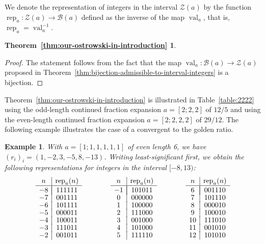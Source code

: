 \documentclass[a4paper,12pt]{amsart}
\newtheorem{example}[definition]{Example}
\newtheorem*{THEOREMA}{Theorem~\ref{thm:our-ostrowski-in-introduction}}
\newcommand{\Bcal}{{\mathcal{B}}}
\newcommand{\Zcal}{{\mathcal{Z}}}
\newcommand{\0}{\mathtt{0}}
\newcommand{\1}{\mathtt{1}}
\newcommand{\2}{\mathtt{2}}
\newcommand{\3}{\mathtt{3}}
\DeclareMathOperator{\rep}{rep}
\DeclareMathOperator{\val}{val}
\begin{document}
We denote the representation of integers in the interval $\Zcal(a)$
by the function $\rep_a:\Zcal(a)\to\Bcal(a)$
defined as the inverse of the map $\val_a$, that is,
$\rep_a = \val_a^{-1}$.

\begin{THEOREMA}
    \MainTheoremA
\end{THEOREMA}

\begin{proof}
    The statement follows from the fact that
    the map $\val_a:\Bcal(a)\to \Zcal(a)$ proposed in
    Theorem~\ref{thm:bijection-admissible-to-interval-integers}
    is a bijection.
\end{proof}

Theorem~\ref{thm:our-ostrowski-in-introduction}
is illustrated in Table~\ref{table:2222}
using the odd-length continued fraction expansion $a=[2;2,2]$ of $12/5$
and
using the even-length continued fraction expansion $a=[2;2,2,2]$ of $29/12$.
The following example illustrates the case of a convergent to the golden ratio.

\begin{example}\label{ex:negaFibonacci}
With $a=[1;1,1,1,1,1]$ of even length 6, we have
$(r_i)_i=(1, -2, 3, -5, 8, -13)$. Writing
least-significant first, we obtain the following representations
for integers in the interval $[-8, 13)$:
    \[
\begin{array}{c|c}
    n & \rep_a(n)\\
    \hline \\[-4mm]
  -8 & 111111 \\[-.5mm]
  -7 & 001111 \\[-.5mm]
  -6 & 101111 \\[-.5mm]
  -5 & 000011 \\[-.5mm]
  -4 & 100011 \\[-.5mm]
  -3 & 111011 \\[-.5mm]
  -2 & 001011
\end{array}
\qquad
\qquad
\begin{array}{c|c}
  n & \rep_a(n)\\
    \hline \\[-4mm]
  -1 & 101011 \\[-.5mm]
  0  & 000000 \\[-.5mm]
  1  & 100000 \\[-.5mm]
  2  & 111000 \\[-.5mm]
  3  & 001000 \\[-.5mm]
  4  & 101000 \\[-.5mm]
  5  & 111110
\end{array}
\qquad
\qquad
\begin{array}{c|c}
  n & \rep_a(n)\\
    \hline \\[-4mm]
  6  & 001110\\[-.5mm]
  7  & 101110\\[-.5mm]
  8  & 000010\\[-.5mm]
  9  & 100010\\[-.5mm]
  10 & 111010\\[-.5mm]
  11 & 001010\\[-.5mm]
  12 & 101010
\end{array}
    \]
\end{example}
\end{document}
